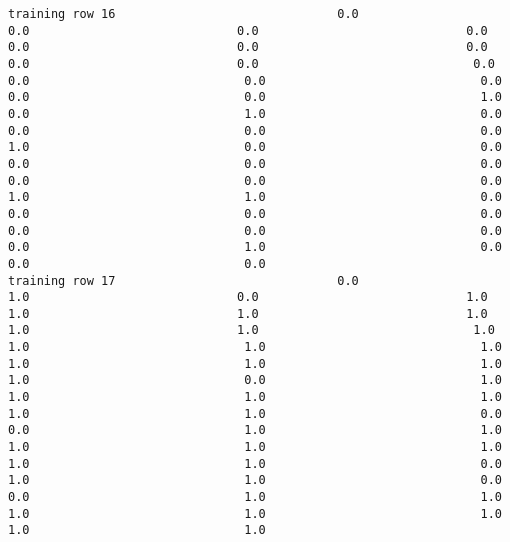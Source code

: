 \documentclass[11pt]{article}
\begin{document}
\begin{verbatim}
training row 16                               0.0                             0.0                             0.0                             0.0                             0.0                             0.0                             0.0                             0.0                             0.0                              0.0                              0.0                              0.0                              0.0                              0.0                              0.0                              1.0                              0.0                              1.0                              0.0                              0.0                              0.0                              0.0                              1.0                              0.0                              0.0                              0.0                              0.0                              0.0                              0.0                              0.0                              0.0                              1.0                              1.0                              0.0                              0.0                              0.0                              0.0                              0.0                              0.0                              0.0                              0.0                              1.0                              0.0                              0.0                              0.0
training row 17                               0.0                             1.0                             0.0                             1.0                             1.0                             1.0                             1.0                             1.0                             1.0                              1.0                              1.0                              1.0                              1.0                              1.0                              1.0                              1.0                              1.0                              0.0                              1.0                              1.0                              1.0                              1.0                              1.0                              1.0                              0.0                              0.0                              1.0                              1.0                              1.0                              1.0                              1.0                              1.0                              1.0                              0.0                              1.0                              1.0                              0.0                              0.0                              1.0                              1.0                              1.0                              1.0                              1.0                              1.0                              1.0

\end{verbatim}
\end{document}
